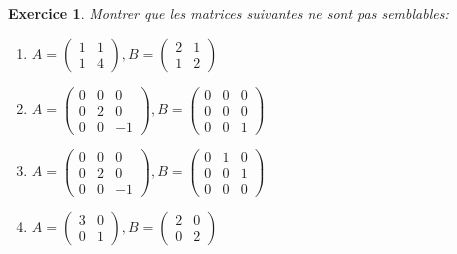 \documentclass[12pt,a4paper]{article}
\theoremstyle{break}
\theoremstyle{break}
\newtheorem{Exo}{Exercice}
\begin{document}
\begin{Exo}
	Montrer que les matrices suivantes ne sont pas semblables:
		\begin{multicols}{2}
	\begin{enumerate}
		\item
		$A=\left( \begin{matrix} 1& 1\\ 1& 4\end{matrix} \right),B= \left( \begin{matrix} 2& 1\\ 1& 2\end{matrix} \right)$
		
		\item
		$A=\left( \begin{matrix} 0& 0& 0\\ 0& 2& 0\\ 0& 0& -1\end{matrix} \right) ,B=\left( \begin{matrix} 0& 0& 0\\ 0& 0& 0\\ 0& 0& 1\end{matrix} \right)$
		\item
		$A=\left( \begin{matrix} 0& 0& 0\\ 0& 2& 0\\ 0& 0& -1\end{matrix} \right) ,B=\left( \begin{matrix} 0& 1& 0\\ 0& 0& 1\\ 0& 0& 0\end{matrix} \right)$
		\item
		$A=\left( \begin{matrix} 3& 0\\ 0& 1\end{matrix} \right) ,B=\left( \begin{matrix} 2& 0\\ 0& 2\end{matrix} \right)$
	\end{enumerate}
		\end{multicols}
\end{Exo}
\end{document}
